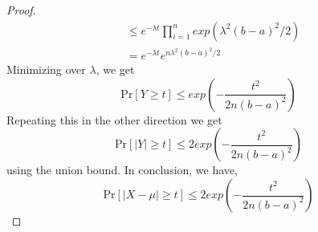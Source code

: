\documentclass[12pt]{article}
\newenvironment{solution}[2][Solution]{\begin{trivlist}
\item[\hskip \labelsep {\bfseries #1}\hskip \labelsep {\bfseries #2.}]}{\end{trivlist}}
\begin{document}
\begin{solution}{6}
\begin{enumerate}[(a)]
\begin{proof}
\begin{align*}
            & \le e^{-\lambda t}\prod_{i=1}^n exp(\lambda^2(b-a)^2/2) \\
            & = e^{-\lambda t} e^{n\lambda^2(b-a)^2/2}
        \end{align*}
        Minimizing over $\lambda$, we get
        \[\mathrm{Pr}[Y \ge t] \le exp(-\frac{t^2}{2n(b-a)^2})\]       
        Repeating this in the other direction we get
        \[\mathrm{Pr}[|Y| \ge t] \le 2exp(-\frac{t^2}{2n(b-a)^2})\]
        using the union bound.
        In conclusion, we have,
        \[\mathrm{Pr}[|X-\mu| \ge t] \le 2exp(-\frac{t^2}{2n(b-a)^2})\]
        \end{proof}
    \end{enumerate}
\end{solution}
\end{document}
